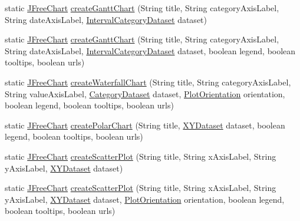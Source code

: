 \begin{DoxyCompactItemize}
\item 
static \mbox{\hyperlink{classorg_1_1jfree_1_1chart_1_1_j_free_chart}{J\+Free\+Chart}} \mbox{\hyperlink{classorg_1_1jfree_1_1chart_1_1_chart_factory_a93bae4bb1deb0c2966677f18b1fea8b8}{create\+Gantt\+Chart}} (String title, String category\+Axis\+Label, String date\+Axis\+Label, \mbox{\hyperlink{interfaceorg_1_1jfree_1_1data_1_1category_1_1_interval_category_dataset}{Interval\+Category\+Dataset}} dataset)
\item 
static \mbox{\hyperlink{classorg_1_1jfree_1_1chart_1_1_j_free_chart}{J\+Free\+Chart}} \mbox{\hyperlink{classorg_1_1jfree_1_1chart_1_1_chart_factory_add1f2777351a69c61b03783473aef899}{create\+Gantt\+Chart}} (String title, String category\+Axis\+Label, String date\+Axis\+Label, \mbox{\hyperlink{interfaceorg_1_1jfree_1_1data_1_1category_1_1_interval_category_dataset}{Interval\+Category\+Dataset}} dataset, boolean legend, boolean tooltips, boolean urls)
\item 
static \mbox{\hyperlink{classorg_1_1jfree_1_1chart_1_1_j_free_chart}{J\+Free\+Chart}} \mbox{\hyperlink{classorg_1_1jfree_1_1chart_1_1_chart_factory_a43b521922a6f65c0d5510f4e197edae7}{create\+Waterfall\+Chart}} (String title, String category\+Axis\+Label, String value\+Axis\+Label, \mbox{\hyperlink{interfaceorg_1_1jfree_1_1data_1_1category_1_1_category_dataset}{Category\+Dataset}} dataset, \mbox{\hyperlink{classorg_1_1jfree_1_1chart_1_1plot_1_1_plot_orientation}{Plot\+Orientation}} orientation, boolean legend, boolean tooltips, boolean urls)
\item 
static \mbox{\hyperlink{classorg_1_1jfree_1_1chart_1_1_j_free_chart}{J\+Free\+Chart}} \mbox{\hyperlink{classorg_1_1jfree_1_1chart_1_1_chart_factory_a92b67cc5adf0e8cd622f20687a000064}{create\+Polar\+Chart}} (String title, \mbox{\hyperlink{interfaceorg_1_1jfree_1_1data_1_1xy_1_1_x_y_dataset}{X\+Y\+Dataset}} dataset, boolean legend, boolean tooltips, boolean urls)
\item 
static \mbox{\hyperlink{classorg_1_1jfree_1_1chart_1_1_j_free_chart}{J\+Free\+Chart}} \mbox{\hyperlink{classorg_1_1jfree_1_1chart_1_1_chart_factory_a7b775cbca394aae38d2e2d1fbb87ff09}{create\+Scatter\+Plot}} (String title, String x\+Axis\+Label, String y\+Axis\+Label, \mbox{\hyperlink{interfaceorg_1_1jfree_1_1data_1_1xy_1_1_x_y_dataset}{X\+Y\+Dataset}} dataset)
\item 
static \mbox{\hyperlink{classorg_1_1jfree_1_1chart_1_1_j_free_chart}{J\+Free\+Chart}} \mbox{\hyperlink{classorg_1_1jfree_1_1chart_1_1_chart_factory_afc96f85191c8af96a2c35389f4374e94}{create\+Scatter\+Plot}} (String title, String x\+Axis\+Label, String y\+Axis\+Label, \mbox{\hyperlink{interfaceorg_1_1jfree_1_1data_1_1xy_1_1_x_y_dataset}{X\+Y\+Dataset}} dataset, \mbox{\hyperlink{classorg_1_1jfree_1_1chart_1_1plot_1_1_plot_orientation}{Plot\+Orientation}} orientation, boolean legend, boolean tooltips, boolean urls)

\end{DoxyCompactItemize}
